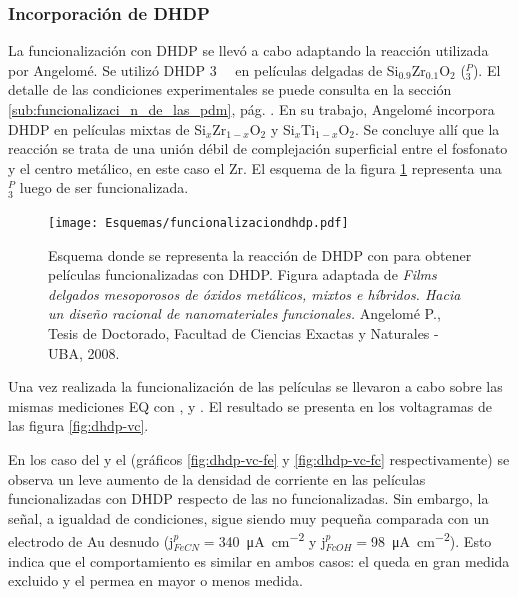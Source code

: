 		\subsubsection{Incorporación de DHDP}
	
			La funcionalización con DHDP se llevó a cabo adaptando la reacción utilizada por Angelomé\cite{Angelome2008}. Se utilizó DHDP \SI{3}{\milli\Molar} en películas delgadas de Si$_{0.9}$Zr$_{0.1}$O$_2$ (\pdmZ$^P_3$). El detalle de las condiciones experimentales se puede consulta en la sección \ref{sub:funcionalizaci_n_de_las_pdm}, pág. \pageref{sub:funcionalizaci_n_de_las_pdm}. En su trabajo, Angelomé incorpora DHDP en películas mixtas de Si$_x$Zr$_{1-x}$O$_2$ y Si$_x$Ti$_{1-x}$O$_2$. Se concluye allí que la reacción se trata de una unión débil de complejación superficial entre el fosfonato y el centro metálico, en este caso el Zr. El esquema de la figura \ref{esq:dhdp-esquema} representa una \pdmZ$^P_3$ luego de ser funcionalizada.

				 \begin{figure}[ht!]	
					\centering
			 	    \texttt{[image: Esquemas/funcionalizaciondhdp.pdf]}
			        \caption[Funcionalización con DHDP 3mM]{Esquema donde se representa la reacción de DHDP con \pdmZ\space para obtener películas funcionalizadas con DHDP. Figura adaptada de \textit{Films delgados mesoporosos de óxidos metálicos, mixtos e híbridos. Hacia un diseño racional de nanomateriales funcionales.} Angelomé P., Tesis de Doctorado, Facultad de Ciencias Exactas y Naturales - UBA, 2008.\cite{Angelome2008}}
			        \label{esq:dhdp-esquema}
			      	\end{figure}

			Una vez realizada la funcionalización de las películas se llevaron a cabo sobre las mismas mediciones EQ con \fe, \fc\space y \ru. El resultado se presenta en los voltagramas de las figura \ref{fig:dhdp-vc}. 

		    En los caso del \fe\space y el \fc\space (gráficos \ref{fig:dhdp-vc-fe} y \ref{fig:dhdp-vc-fc} respectivamente) se observa un leve aumento de la densidad de corriente en las películas funcionalizadas con DHDP respecto de las no funcionalizadas. Sin embargo, la señal, a igualdad de condiciones, sigue siendo muy pequeña comparada con un electrodo de Au desnudo (j$^p_{FeCN}\!=$\SI{340}{\micro\ampere\per\square\cm} y j$^p_{FcOH}\!=$\SI{98}{\micro\ampere\per\square\cm}). Esto indica que el comportamiento es similar en ambos casos: el \fe\space queda en gran medida excluido y el \fc\space permea en mayor o menos medida.

